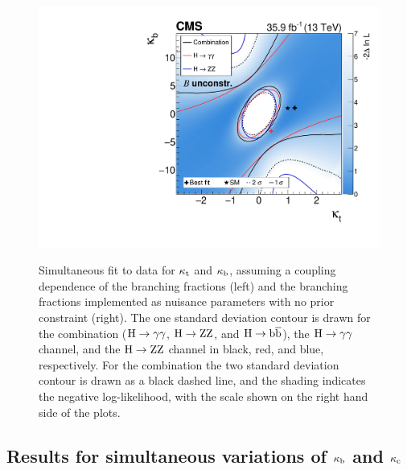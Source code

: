 \begin{figure}[hbtp]
\begin{center}
{        \includegraphics[width=0.49\linewidth]{img/interpretation/multicont_ktkb_floatingBRs.pdf}        
        }
    \caption{
        Simultaneous fit to data for $\kappa_{\mathrm{t}}$ and $\kappa_{\mathrm{b}}$, assuming a coupling dependence of the branching fractions (left) and the branching fractions implemented as nuisance parameters with no prior constraint (right).
        The one standard deviation contour is drawn for the combination ($\mathrm{H}\to\mathrm{\gamma}\mathrm{\gamma}$, $\mathrm{H}\to\mathrm{Z}\mathrm{Z}$, and $\mathrm{H}\to\mathrm{b}\overline{\mathrm{b}}$), the $\mathrm{H}\to\mathrm{\gamma}\mathrm{\gamma}$ channel, and the $\mathrm{H}\to\mathrm{Z}\mathrm{Z}$ channel in black, red, and blue, respectively.
        For the combination the two standard deviation contour is drawn as a black dashed line, and the shading indicates the negative log-likelihood, with the scale shown on the right hand side of the plots.
        }
    \label{fig:ktkb}
  \end{center}
\end{figure}



\subsection{Results for simultaneous variations of \texorpdfstring{$\kappa_{\mathrm{b}}$}{kb} and \texorpdfstring{$\kappa_{\mathrm{c}}$}{kc}}
\label{sec:interpretation-results-kbkc}


